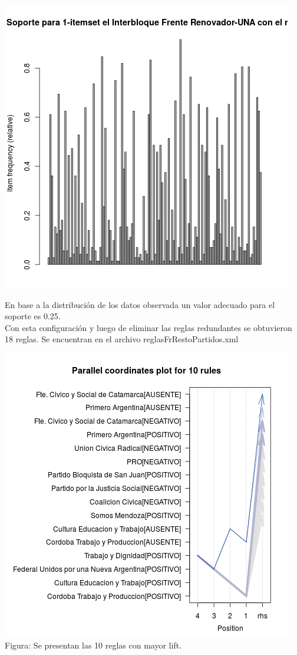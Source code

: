 \documentclass{endm}
\begin{document}
\begin{center}
\includegraphics[scale=0.4]{graficos/soportesFrRestoPartidos.png}
\end{center}

En base a la distribución de los datos observada un valor adecuado para el soporte es 0.25. \\

Con esta configuración y luego de eliminar las reglas redundantes se obtuvieron 18 reglas. Se encuentran en el archivo reglasFrRestoPartidos.xml  \\

\begin{center}
\includegraphics[scale=0.4]{graficos/paracoordFrPartidos.png} \\
\scriptsize{Figura: Se presentan las 10 reglas con mayor lift.} \\
\end{center} 
\end{document}
